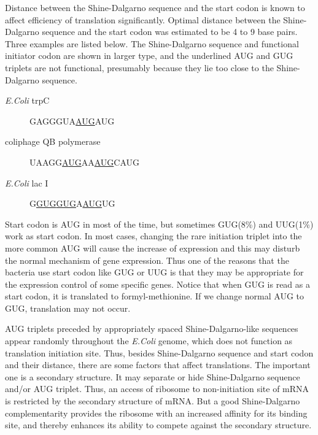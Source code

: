  Distance between the Shine-Dalgarno sequence and
the start codon is known to affect efficiency of translation
significantly. 
Optimal distance between the Shine-Dalgarno sequence and the start codon was
estimated to be 4 to 9 base pairs\cite{label9}.
Three examples are listed below. The Shine-Dalgarno sequence and functional
initiator codon are shown in larger type, and the underlined AUG and
GUG triplets are not functional, presumably because they lie too close
to the Shine-Dalgarno sequence\cite{label22}.


\begin{description}
\item[{\it E.Coli} trpC]  {\large GAGG}GUA\underline{AUG}{\large AUG}
\item[coliphage QB polymerase]
{\large UAAGG\underline{A}}\underline{UG}AA\underline{AUG}C{\large AUG} 
\item[{\it E.Coli} lac I] 
{\large G\underline{GUG}}\underline{GUG}A\underline{AU{\large G}}{\large UG}
\end{description}




Start codon is AUG in most of the time, but sometimes GUG(8\%) and UUG(1\%)
work as start codon. In most cases, changing the rare initiation triplet
into the more common AUG will cause the increase of expression and this
may disturb the normal mechanism of gene expression. Thus one of the reasons
that the bacteria use start codon like GUG or UUG is that they may be
appropriate for the expression control of some specific genes. Notice that
when GUG is read as a start codon, it is translated to formyl-methionine.
If we change normal AUG to GUG, translation may not occur.


AUG triplets preceded by appropriately
spaced Shine-Dalgarno-like sequences appear randomly throughout the
{\it E.Coli} genome, which does not function as translation initiation site.
Thus, besides Shine-Dalgarno sequence and start codon and their distance,
there are some factors that affect translations. The important one is 
a secondary structure. It may separate or hide Shine-Dalgarno sequence
and/or AUG triplet.
Thus, an access of ribosome to non-initiation site of mRNA is restricted by the
secondary structure of mRNA. But a good Shine-Dalgarno complementarity
provides the ribosome with an increased affinity for its binding site,
and thereby enhances its ability to compete against the secondary 
structure\cite{label26}.

